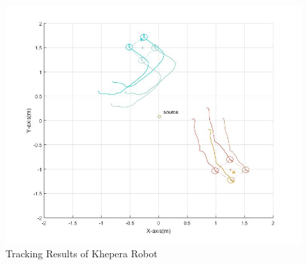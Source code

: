 \documentclass{article}
\begin{document}
\begin{figure}[htbp]
\centering
\includegraphics[width=12cm]{TrackingresultPoor} 
\caption{Tracking Results of Khepera Robot}\label{figTrackPoor}
\end{figure}
\end{document}
